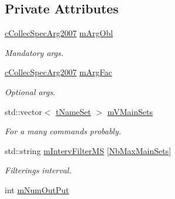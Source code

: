 \subsection*{Private Attributes}
\begin{DoxyCompactItemize}
\item 
\hyperlink{classMMVII_1_1cCollecSpecArg2007}{c\+Collec\+Spec\+Arg2007} \hyperlink{classMMVII_1_1cMMVII__Appli_a86f7322447bc62804d397f01b9e346c7}{m\+Arg\+Obl}\hypertarget{classMMVII_1_1cMMVII__Appli_a86f7322447bc62804d397f01b9e346c7}{}\label{classMMVII_1_1cMMVII__Appli_a86f7322447bc62804d397f01b9e346c7}

\begin{DoxyCompactList}\small\item\em Mandatory args. \end{DoxyCompactList}\item 
\hyperlink{classMMVII_1_1cCollecSpecArg2007}{c\+Collec\+Spec\+Arg2007} \hyperlink{classMMVII_1_1cMMVII__Appli_a18ca3cf743bc5d1c3f9250d0302fe25f}{m\+Arg\+Fac}\hypertarget{classMMVII_1_1cMMVII__Appli_a18ca3cf743bc5d1c3f9250d0302fe25f}{}\label{classMMVII_1_1cMMVII__Appli_a18ca3cf743bc5d1c3f9250d0302fe25f}

\begin{DoxyCompactList}\small\item\em Optional args. \end{DoxyCompactList}\item 
std\+::vector$<$ \hyperlink{classMMVII_1_1cExtSet}{t\+Name\+Set} $>$ \hyperlink{classMMVII_1_1cMMVII__Appli_a092463147c8cde58a2eb1ec1147121a3}{m\+V\+Main\+Sets}\hypertarget{classMMVII_1_1cMMVII__Appli_a092463147c8cde58a2eb1ec1147121a3}{}\label{classMMVII_1_1cMMVII__Appli_a092463147c8cde58a2eb1ec1147121a3}

\begin{DoxyCompactList}\small\item\em For a many commands probably. \end{DoxyCompactList}\item 
std\+::string \hyperlink{classMMVII_1_1cMMVII__Appli_ac3534cd89df89a254e1b58934c79b328}{m\+Interv\+Filter\+MS} \mbox{[}\hyperlink{classMMVII_1_1cMMVII__Appli_a819abde678fbc53402c9bc10ba8ef7f4}{Nb\+Max\+Main\+Sets}\mbox{]}\hypertarget{classMMVII_1_1cMMVII__Appli_ac3534cd89df89a254e1b58934c79b328}{}\label{classMMVII_1_1cMMVII__Appli_ac3534cd89df89a254e1b58934c79b328}

\begin{DoxyCompactList}\small\item\em Filterings interval. \end{DoxyCompactList}\item 
int \hyperlink{classMMVII_1_1cMMVII__Appli_a55fc539a1cf1434f2ee551143fe55c86}{m\+Num\+Out\+Put}\hypertarget{classMMVII_1_1cMMVII__Appli_a55fc539a1cf1434f2ee551143fe55c86}{}\label{classMMVII_1_1cMMVII__Appli_a55fc539a1cf1434f2ee551143fe55c86}


\end{DoxyCompactItemize}
